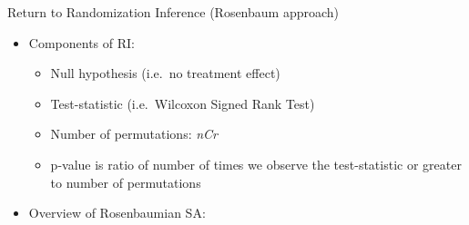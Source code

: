 \documentclass[ignorenonframetext,]{beamer}
\providecommand{\tightlist}{%
  \setlength{\itemsep}{0pt}\setlength{\parskip}{0pt}}
\begin{document}
\begin{frame}{Return to Randomization Inference (Rosenbaum approach)}

\begin{itemize}
\tightlist
\item
  Components of RI:

  \begin{itemize}
  \tightlist
  \item
    Null hypothesis (i.e.~no treatment effect)
  \item
    Test-statistic (i.e.~Wilcoxon Signed Rank Test)
  \item
    Number of permutations: \emph{nCr}
  \item
    p-value is ratio of number of times we observe the test-statistic or
    greater to number of permutations
  \end{itemize}
\item
  Overview of Rosenbaumian SA:
\end{itemize}


\end{frame}
\end{document}
